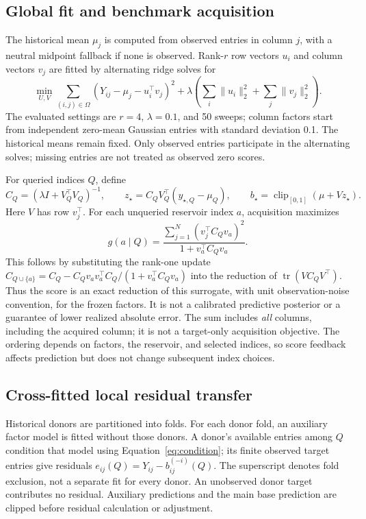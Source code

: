 \documentclass{article}
\newcommand{\clip}{\operatorname{clip}_{[0,1]}}
\begin{document}
\subsection{Global fit and benchmark acquisition}
The historical mean $\mu_j$ is computed from observed entries in column $j$, with a neutral midpoint fallback if none is observed. Rank-$r$ row vectors $u_i$ and column vectors $v_j$ are fitted by alternating ridge solves for
\begin{equation}
 \min_{U,V}\sum_{(i,j)\in\Omega}(Y_{ij}-\mu_j-u_i^\top v_j)^2
       +\lambda\left(\sum_i\|u_i\|_2^2+\sum_j\|v_j\|_2^2\right).
 \label{eq:als}
\end{equation}
The evaluated settings are $r=4$, $\lambda=0.1$, and 50 sweeps; column factors start from independent zero-mean Gaussian entries with standard deviation 0.1. The historical means remain fixed. Only observed entries participate in the alternating solves; missing entries are not treated as observed zero scores.

For queried indices $Q$, define
\begin{equation}
 C_Q=(\lambda I+V_Q^\top V_Q)^{-1},\qquad
 z_\star=C_Q V_Q^\top(y_{\star,Q}-\mu_Q),\qquad
 b_\star=\clip(\mu+Vz_\star).
 \label{eq:condition}
\end{equation}
Here $V$ has row $v_j^\top$. For each unqueried reservoir index $a$, acquisition maximizes
\begin{equation}
 g(a\mid Q)=\frac{\sum_{j=1}^N(v_j^\top C_Qv_a)^2}{1+v_a^\top C_Qv_a}.
 \label{eq:query}
\end{equation}
This follows by substituting the rank-one update
$C_{Q\cup\{a\}}=C_Q-C_Qv_av_a^\top C_Q/(1+v_a^\top C_Qv_a)$
into the reduction of $\operatorname{tr}(VC_QV^\top)$. Thus the score is an exact reduction of this surrogate, with unit observation-noise convention, for the frozen factors. It is not a calibrated predictive posterior or a guarantee of lower realized absolute error. The sum includes \emph{all} columns, including the acquired column; it is not a target-only acquisition objective. The ordering depends on factors, the reservoir, and selected indices, so score feedback affects prediction but does not change subsequent index choices.

\subsection{Cross-fitted local residual transfer}
Historical donors are partitioned into folds. For each donor fold, an auxiliary factor model is fitted without those donors. A donor's available entries among $Q$ condition that model using Equation~\ref{eq:condition}; its finite observed target entries give residuals $e_{ij}(Q)=Y_{ij}-b^{(-i)}_{ij}(Q)$. The superscript denotes fold exclusion, not a separate fit for every donor. An unobserved donor target contributes no residual. Auxiliary predictions and the main base prediction are clipped before residual calculation or adjustment.
\end{document}
